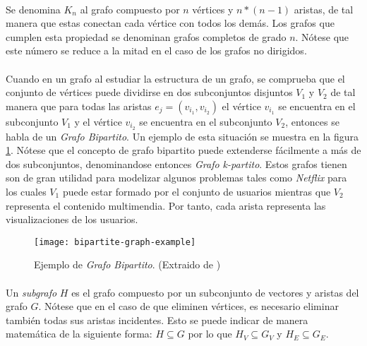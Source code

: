 \documentclass{subfiles}
\begin{document}
      \paragraph{}
      Se denomina $K_n$ al grafo compuesto por $n$ vértices y $n*(n-1)$ aristas, de tal manera que estas conectan cada vértice con todos los demás. Los grafos que cumplen esta propiedad se denominan grafos completos de grado $n$. Nótese que este número se reduce a la mitad en el caso de los grafos no dirigidos.

      \paragraph{}
      Cuando en un grafo al estudiar la estructura de un grafo, se comprueba que el conjunto de vértices puede dividirse en dos subconjuntos disjuntos $V_1$ y $V_2$ de tal manera que para todas las aristas $e_j = (v_{i_1}, v_{i_2})$ el vértice $v_{i_1}$ se encuentra en el subconjunto $V_1$ y el vértice $v_{i_2}$ se encuentra en el subconjunto $V_2$, entonces se habla de un \emph{Grafo Bipartito}. Un ejemplo de esta situación se muestra en la figura \ref{img:bipartite_graph_example}. Nótese que el concepto de grafo bipartito puede extenderse fácilmente a más de dos subconjuntos, denominandose entonces \emph{Grafo k-partito}. Estos grafos tienen son de gran utilidad para modelizar algunos problemas tales como \emph{Netflix} para los cuales $V_1$ puede estar formado por el conjunto de usuarios mientras que $V_2$ representa el contenido multimendia. Por tanto, cada arista representa las visualizaciones de los usuarios.

      \begin{figure}
        \centering
        \texttt{[image: bipartite-graph-example]}
        \caption{Ejemplo de \emph{Grafo Bipartito}. (Extraido de \cite{wiki:Graph_(discrete_mathematics)})}
        \label{img:bipartite_graph_example}
      \end{figure}

      \paragraph{}
      Un \emph{subgrafo} $H$ es el grafo compuesto por un subconjunto de vectores y aristas del grafo $G$. Nótese que en el caso de que eliminen vértices, es necesario eliminar también todas sus aristas incidentes. Esto se puede indicar de manera matemática de la siguiente forma: $H \subseteq G$ por lo que $H_V \subseteq G_V$ y $H_E \subseteq G_E$.
\end{document}
